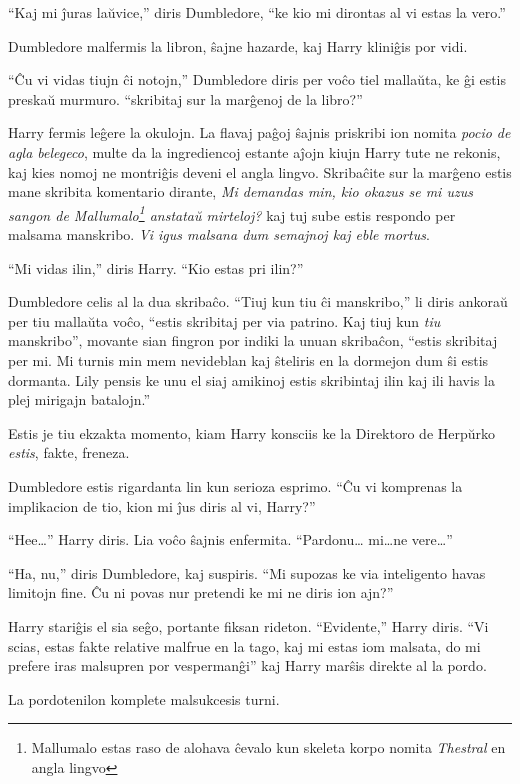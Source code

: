 ``Kaj mi ĵuras laŭvice,'' diris Dumbledore, ``ke kio mi dirontas al vi
estas la vero.''

Dumbledore malfermis la libron, ŝajne hazarde, kaj Harry kliniĝis por vidi.

``Ĉu vi vidas tiujn ĉi notojn,'' Dumbledore diris per voĉo tiel
mallaŭta, ke ĝi estis preskaŭ murmuro. ``skribitaj sur la marĝenoj de
la libro?''

Harry fermis leĝere la okulojn. La flavaj paĝoj ŝajnis priskribi ion
nomita \emph{pocio de agla belegeco}, multe da la ingrediencoj estante
aĵojn kiujn Harry tute ne rekonis, kaj kies nomoj ne montriĝis deveni
el angla lingvo. Skribaĉite sur la marĝeno estis mane skribita
komentario dirante, \emph{Mi demandas min, kio okazus se mi uzus
sangon de Mallumalo\footnote{Mallumalo estas raso de alohava ĉevalo
kun skeleta korpo nomita \emph{Thestral} en angla lingvo} anstataŭ
mirteloj?} kaj tuj sube estis respondo per malsama manskribo. \emph{Vi
igus malsana dum semajnoj kaj eble mortus}.

``Mi vidas ilin,'' diris Harry. ``Kio estas pri ilin?''

Dumbledore celis al la dua skribaĉo. ``Tiuj kun tiu ĉi manskribo,'' li
diris ankoraŭ per tiu mallaŭta voĉo, ``estis skribitaj per via
patrino. Kaj tiuj kun \emph{tiu} manskribo'', movante sian fingron por
indiki la unuan skribaĉon, ``estis skribitaj per mi. Mi turnis min
mem nevideblan kaj ŝteliris en la dormejon dum ŝi estis dormanta. Lily
pensis ke unu el siaj amikinoj estis skribintaj ilin kaj ili havis la
plej mirigajn batalojn.''

Estis je tiu ekzakta momento, kiam Harry konsciis ke la Direktoro de
Herpŭrko \emph{estis}, fakte, freneza.

Dumbledore estis rigardanta lin kun serioza esprimo. ``Ĉu vi
komprenas la implikacion de tio, kion mi ĵus diris al vi, Harry?''

``Hee\ldots'' Harry diris. Lia voĉo ŝajnis enfermita. ``Pardonu\ldots
mi\ldots ne vere\ldots''

``Ha, nu,'' diris Dumbledore, kaj suspiris. ``Mi supozas ke via
inteligento havas limitojn fine. Ĉu ni povas nur pretendi ke mi ne
diris ion ajn?''

Harry stariĝis el sia seĝo, portante fiksan rideton. ``Evidente,''
Harry diris. ``Vi scias, estas fakte relative malfrue en la tago, kaj
mi estas iom malsata, do mi prefere iras malsupren por vespermanĝi''
kaj Harry marŝis direkte al la pordo.

La pordotenilon komplete malsukcesis turni.

